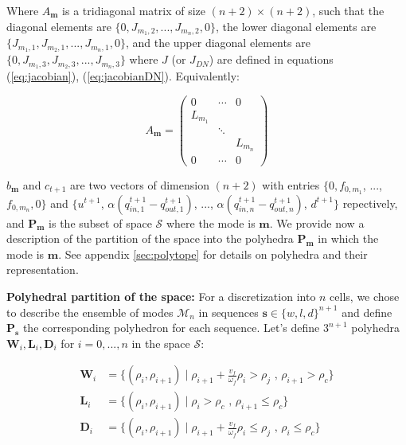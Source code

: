 \documentclass[11pt]{article}
\numberwithin{equation}{section}
\numberwithin{figure}{section}
\numberwithin{table}{section}
\begin{document}
\noindent Where $A_{\boldsymbol m}$ is a tridiagonal matrix of size $(n+2)\times(n+2)$, such that the diagonal elements are $\{0, J_{m_{1},2},...,J_{m_{n},2},0\}$, the lower diagonal elements are $\{J_{m_{1},1},J_{m_{2},1},...,J_{m_{n},1},0\}$, and the upper diagonal elements are $\{0,J_{m_{1},3},J_{m_{2},3},...,J_{m_{n},3}\}$ where $J$ (or $J_{DN}$) are defined in equations (\ref{eq:jacobian}), (\ref{eq:jacobianDN}). Equivalently:

\begin{equation}\label{eq:matrixA}
 A_{\boldsymbol m} =
 \begin{pmatrix}
0 & \cdots & 0 \\
L_{m_{1}} & & \\
& \ddots & \\
& & L_{m_{n}}\\
0 & \cdots & 0
\end{pmatrix}
\end{equation}

\noindent $b_{\boldsymbol m}$ and $c_{t+1}$ are two vectors of dimension $(n+2)$ with entries $\{0, f_{0,m_{1}}$, ..., $f_{0,m_{n}}, 0\}$ and $\{u^{t+1}$, $\alpha (q^{t+1}_{in,1}-q^{t+1}_{out,1})$, ..., $\alpha(q^{t+1}_{in,n}-q^{t+1}_{out,n})$, $d^{t+1}\}$ repectively, and $\textbf{P}_{\boldsymbol m}$ is the subset of space $\mathcal{S}$ where the mode is $\boldsymbol m$. We provide now a description of the partition of the space into the polyhedra $\textbf{P}_{\boldsymbol m}$ in which the mode is $\boldsymbol m$. See appendix \ref{sec:polytope} for details on polyhedra and their representation.

\hspace{10mm}

\noindent\textbf{Polyhedral partition of the space:} For a discretization into $n$ cells, we chose to describe the ensemble of modes $\mathcal{M}_{n}$ in sequences $\boldsymbol s \in \{w,l,d\}^{n+1}$ and define $\textbf{P}_{\boldsymbol s}$ the corresponding polyhedron for each sequence. Let's define $3^{n+1}$ polyhedra $\textbf{W}_{i}, \textbf{L}_{i}, \textbf{D}_{i}$ for $i=0,...,n$ in the space $\mathcal{S}$:

\begin{equation}
\begin{array}{ll}
\textbf{W}_{i} & = \{(\rho_{i},\rho_{i+1}) \mid \rho_{i+1} + \frac{v_{f}}{\omega_{f}}\rho_{i} > \rho_{j} \text{ ,   } \rho_{i+1} > \rho_{c}\}\\
\textbf{L}_{i} & = \{(\rho_{i},\rho_{i+1}) \mid \rho_{i} > \rho_{c} \text{ ,   } \rho_{i+1} \leq \rho_{c}\}\\
\textbf{D}_{i} & = \{(\rho_{i},\rho_{i+1}) \mid \rho_{i+1} + \frac{v_{f}}{\omega_{f}}\rho_{i} \leq \rho_{j} \text{ ,   } \rho_{i} \leq \rho_{c}\}
\end{array}
\label{eq:regions3}
\end{equation}
\end{document}
